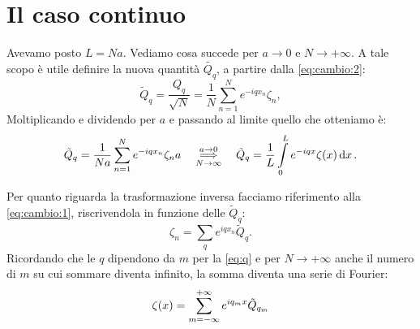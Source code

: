 \section{Il caso continuo}\label{s:casocontinuo}
    Avevamo posto $L=Na$. Vediamo cosa succede per $a\rightarrow 0$ e $N\rightarrow+\infty$. A tale scopo \`e utile definire la nuova quantit\`a $\tilde{Q_q}$, a partire dalla \eqref{eq:cambio:2}:
        $$\tilde{Q}_q=\frac{Q_q}{\sqrt{N}}=\frac{1}{N}\sum_{n=1}^Ne^{-iqx_n}\zeta_n,$$
    Moltiplicando e dividendo per $a$ e passando al limite quello che otteniamo \`e:
        $$\tilde{Q}_q=\frac{1}{Na}\sum_{n=1}^Ne^{-iqx_n}\zeta_na\quad\underset{N\to\infty}{\overset{a\to 0}{\implies}}\quad\tilde{Q}_q=\frac{1}{L}\int\limits_0^Le^{-iqx}\zeta\qty(x)\dd{x}.$$
    \par Per quanto riguarda la trasformazione inversa facciamo riferimento alla \eqref{eq:cambio:1}, riscrivendola in funzione delle $\tilde{Q}_q$:
        $$\zeta_n=\sum_qe^{iqx_n}\tilde{Q}_q.$$
    Ricordando che le $q$ dipendono da $m$ per la \eqref{eq:q} e per $N\rightarrow+\infty$ anche il numero di $m$ su cui sommare diventa infinito, la somma diventa una serie di Fourier:
    \begin{equation}
        \zeta\qty(x)=\sum_{m=-\infty}^{+\infty}e^{iq_mx}\tilde{Q}_{q_m}
        \label{eq:cambiocontinuo:2}
    \end{equation}
    